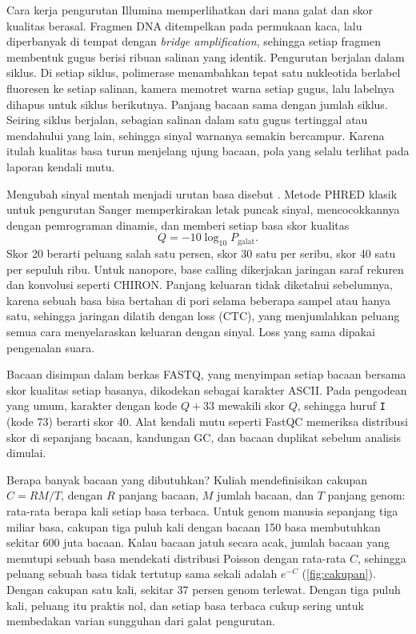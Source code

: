 Cara kerja pengurutan Illumina memperlihatkan dari mana galat dan skor kualitas berasal. Fragmen DNA ditempelkan pada permukaan
kaca, lalu diperbanyak di tempat dengan \emph{bridge amplification}, sehingga setiap fragmen membentuk gugus berisi ribuan salinan yang
identik. Pengurutan berjalan dalam siklus. Di setiap siklus, polimerase menambahkan tepat satu nukleotida berlabel fluoresen ke setiap
salinan, kamera memotret warna setiap gugus, lalu labelnya dihapus untuk siklus berikutnya. Panjang bacaan sama dengan jumlah siklus.
Seiring siklus berjalan, sebagian salinan dalam satu gugus tertinggal atau mendahului yang lain, sehingga sinyal warnanya semakin
bercampur. Karena itulah kualitas basa turun menjelang ujung bacaan, pola yang selalu terlihat pada laporan kendali mutu.

Mengubah sinyal mentah menjadi urutan basa disebut . Metode PHRED klasik untuk pengurutan Sanger
memperkirakan letak puncak sinyal, mencocokkannya dengan pemrograman dinamis, dan memberi setiap basa skor kualitas
\begin{equation}
Q=-10\log_{10}P_{\mathrm{galat}}.
\end{equation}
Skor 20 berarti peluang salah satu persen, skor 30 satu per seribu, skor 40 satu per sepuluh ribu. Untuk nanopore,
base calling dikerjakan jaringan saraf rekuren dan konvolusi seperti CHIRON. Panjang keluaran tidak diketahui
sebelumnya, karena sebuah basa bisa bertahan di pori selama beberapa sampel atau hanya satu, sehingga jaringan dilatih
dengan loss  (CTC), yang menjumlahkan peluang semua cara menyelaraskan
keluaran dengan sinyal. Loss yang sama dipakai pengenalan suara.

Bacaan disimpan dalam berkas FASTQ, yang menyimpan setiap bacaan bersama skor kualitas setiap basanya, dikodekan sebagai
karakter ASCII. Pada pengodean yang umum, karakter dengan kode $Q+33$ mewakili skor $Q$, sehingga huruf \texttt{I}
(kode 73) berarti skor 40. Alat kendali mutu seperti FastQC memeriksa distribusi skor di sepanjang bacaan, kandungan GC,
dan bacaan duplikat sebelum analisis dimulai.

Berapa banyak bacaan yang dibutuhkan? Kuliah mendefinisikan cakupan $C=RM/T$, dengan $R$ panjang bacaan, $M$ jumlah
bacaan, dan $T$ panjang genom: rata-rata berapa kali setiap basa terbaca. Untuk genom manusia sepanjang tiga miliar basa,
cakupan tiga puluh kali dengan bacaan 150 basa membutuhkan sekitar 600 juta bacaan. Kalau bacaan jatuh secara acak,
jumlah bacaan yang menutupi sebuah basa mendekati distribusi Poisson dengan rata-rata $C$, sehingga peluang sebuah basa
tidak tertutup sama sekali adalah $e^{-C}$ (\cref{fig:cakupan}). Dengan cakupan satu kali, sekitar 37 persen genom
terlewat. Dengan tiga puluh kali, peluang itu praktis nol, dan setiap basa terbaca cukup sering untuk membedakan varian
sungguhan dari galat pengurutan.


